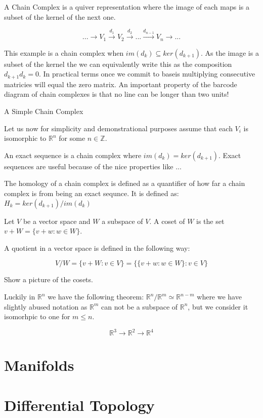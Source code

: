 A Chain Complex is a quiver representation where the image of each maps is a subset of the kernel of the next one.

$$ ... \longrightarrow V_1 \overset{d_1}{\longrightarrow} V_2 \overset{d_2}{\longrightarrow} ... \overset{d_{n-1}}{\longrightarrow} V_n  \longrightarrow ... $$

This example is a chain complex when $im(d_k) \subseteq ker(d_{k+1})$. As the image is a subset of the kernel the we can equivalently write this as the composition $d_{k+1}d_k = 0$. In practical terms once we commit to baseis multiplying consecutive matricies will equal the zero matrix. An important property of the barcode diagram of chain complexes is that no line can be longer than two units!


\begin{ex}  A Simple Chain Complex \end{ex}
Let us now for simplicity and demonstrational purposes assume that each $V_i$ is isomorphic to $\mathbb{R}^n$ for some $n \in \mathbb{Z}$.


An exact sequence is a chain complex where $im(d_k) = ker(d_{k+1})$. Exact sequences are useful because of the nice properties like ...

The homology of a chain complex is defined as a quantifier of how far a chain complex is from being an exact sequnce. It is defined as: $ H_k = ker(d_{k+1}) / im(d_k) $

Let $V$ be a vector space and $W$ a subspace of $V$. A coset of $W$ is the set $v + W = \{v + w : w \in W\}$.

A quotient in a vector space is defined in the following way: 

$$ V/W = \{v + W: v \in V\} = \{\{v + w : w \in W\} : v \in V \}$$

Show a picture of the cosets.

Luckily in $\mathbb{R}^n$ we have the following theorem: $\mathbb{R}^n / \mathbb{R}^m \simeq \mathbb{R}^{n - m} $ where we have slightly abused notation as $\mathbb{R}^m$ can not be a subspace of $\mathbb{R}^n$, but we consider it isomorhpic to one for $m \le n$.

$$ \mathbb{R}^3 {\longrightarrow} \mathbb{R}^2 {\longrightarrow} \mathbb{R}^4 $$


\section{Manifolds}

\section{Differential Topology}

